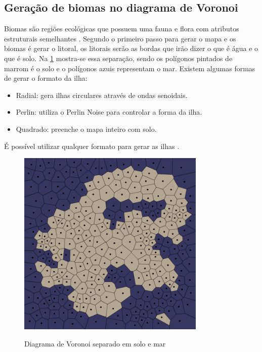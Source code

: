 \subsection{Geração de biomas no diagrama de Voronoi}
\label{sec:geracaoProcedural}

Biomas são regiões ecológicas que possuem uma fauna e flora com atributos estruturais semelhantes \space\cite{maestrovirtuale}. Segundo  o primeiro passo para gerar o mapa e os biomas é gerar o litoral, os litorais serão as bordas que irão dizer o que é água e o que é solo. Na \cref{fig:voronoi-land-water} mostra-se essa separação, sendo os polígonos pintados de marrom é o solo e o polígonos azuis representam o mar. Existem algumas formas de gerar o formato da ilha:

\begin{itemize}
    \item Radial: gera ilhas circulares através de ondas senoidais.
    \item Perlin: utiliza o Perlin Noise para controlar a forma da ilha.
    \item Quadrado: preenche o mapa inteiro com solo.
\end{itemize}

É possível utilizar qualquer formato para gerar as ilhas \space\cite{amitp2010}.

\begin{figure}[ht]
	\caption{Diagrama de Voronoi separado em solo e mar}
	\centering %
	\includegraphics[width=0.8\textwidth]{figures/voronoi-land-water.png} %
	\label{fig:voronoi-land-water}
\end{figure}

